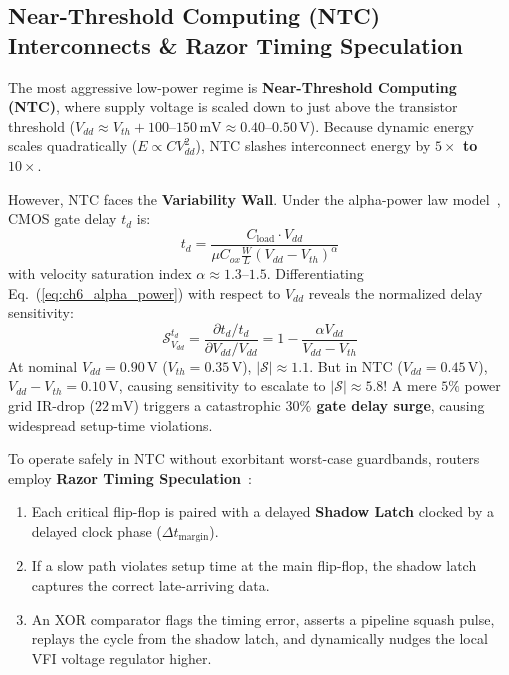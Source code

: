 \subsection{Near-Threshold Computing (NTC) Interconnects \& Razor Timing Speculation}
\label{subsec:ch6_ntc}

The most aggressive low-power regime is \textbf{Near-Threshold Computing (NTC)}, where supply voltage is scaled down to just above the transistor threshold ($V_{dd} \approx V_{th} + 100\text{--}150\,\mathrm{mV} \approx 0.40\text{--}0.50\,\mathrm{V}$). Because dynamic energy scales quadratically ($E \propto C V_{dd}^2$), NTC slashes interconnect energy by \textbf{$5\times$ to $10\times$}.

However, NTC faces the \textbf{Variability Wall}. Under the alpha-power law model~\cite{Sakurai1990}, CMOS gate delay $t_d$ is:
\begin{equation}
t_d = \frac{C_{\mathrm{load}} \cdot V_{dd}}{\mu C_{ox} \frac{W}{L} (V_{dd} - V_{th})^\alpha}
\label{eq:ch6_alpha_power}
\end{equation}
with velocity saturation index $\alpha \approx 1.3\text{--}1.5$. Differentiating Eq.~(\ref{eq:ch6_alpha_power}) with respect to $V_{dd}$ reveals the normalized delay sensitivity:
\begin{equation}
\mathcal{S}_{V_{dd}}^{t_d} = \frac{\partial t_d / t_d}{\partial V_{dd} / V_{dd}} = 1 - \frac{\alpha V_{dd}}{V_{dd} - V_{th}}
\label{eq:ch6_ntc_sensitivity}
\end{equation}
At nominal $V_{dd} = 0.90\,\mathrm{V}$ ($V_{th} = 0.35\,\mathrm{V}$), $|\mathcal{S}| \approx 1.1$. But in NTC ($V_{dd} = 0.45\,\mathrm{V}$), $V_{dd} - V_{th} = 0.10\,\mathrm{V}$, causing sensitivity to escalate to $|\mathcal{S}| \approx 5.8$! A mere $5\%$ power grid IR-drop ($22\,\mathrm{mV}$) triggers a catastrophic \textbf{$30\%$ gate delay surge}, causing widespread setup-time violations.

To operate safely in NTC without exorbitant worst-case guardbands, routers employ \textbf{Razor Timing Speculation}~\cite{Ernst2003}:
\begin{enumerate}
    \item Each critical flip-flop is paired with a delayed \textbf{Shadow Latch} clocked by a delayed clock phase ($\Delta t_{\mathrm{margin}}$).
    \item If a slow path violates setup time at the main flip-flop, the shadow latch captures the correct late-arriving data.
    \item An XOR comparator flags the timing error, asserts a pipeline squash pulse, replays the cycle from the shadow latch, and dynamically nudges the local VFI voltage regulator higher.
\end{enumerate}

